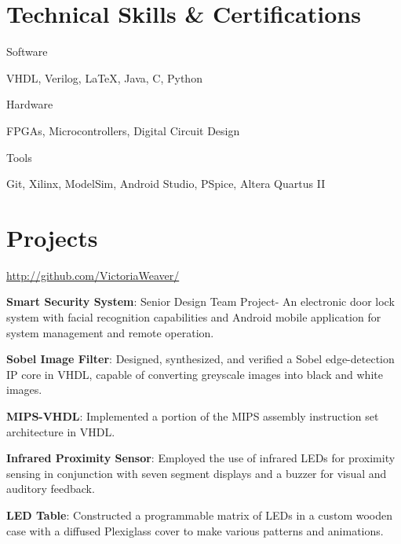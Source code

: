 \documentclass[a4paper,margin,line]{resume}
\begin{document}
\begin{resume}
\section{\mysidestyle Technical Skills \& Certifications}
    \begin{compactdesc}
        \item[Software] \begin{inparaenum} { \small
            VHDL,
            Verilog,
            \LaTeX,
            Java,
            C,
            Python
        } \end{inparaenum}
        \item[Hardware] \begin{inparaenum} { \small
            FPGAs, Microcontrollers, Digital Circuit Design
       } \end{inparaenum}
        \item[Tools] \begin{inparaenum} { \small
            Git,
            Xilinx,
            ModelSim,
            Android Studio,
            PSpice,
            Altera Quartus II
        } \end{inparaenum}
    \end{compactdesc}

\section{\mysidestyle Projects}
    \begin{asparablank}
        \item \href{http://github.com/VictoriaWeaver/}{http://github.com/VictoriaWeaver/}\\
        \item \textbf{Smart Security System}: Senior Design Team Project- An electronic door lock system with facial recognition capabilities and Android mobile application for system management and remote operation.\\
        \item \textbf{Sobel Image Filter}: Designed, synthesized, and verified a Sobel edge-detection IP core in VHDL, capable of converting greyscale images into black and white images.\\
        \item \textbf{MIPS-VHDL}: Implemented a portion of the MIPS assembly instruction set 
            architecture in VHDL.\\
        \item \textbf{Infrared Proximity Sensor}: Employed the use of infrared LEDs for proximity 
            sensing in conjunction with seven segment displays and a buzzer for visual and auditory 
            feedback.\\
        \item \textbf{LED Table}: Constructed a programmable matrix of LEDs in a custom wooden 
            case with a diffused Plexiglass cover to make various patterns and animations.\\
    \end{asparablank}
    

\end{resume}
\end{document}
